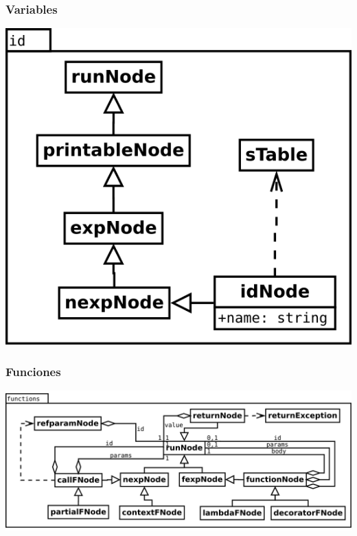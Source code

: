 \subsubsection {Variables}
\begin{center}
\includegraphics[scale=0.4]{id.png} \\
\end{center}

\subsubsection {Funciones}
\begin{center}
\includegraphics[scale=0.4]{functions.png} \\
\end{center}

